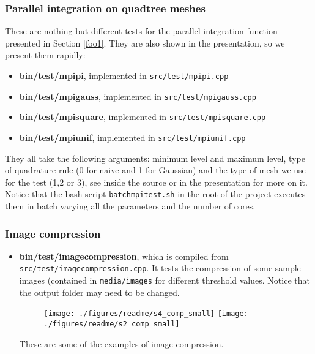 \documentclass[a4paper,10pt]{article}
\begin{document}
\subsubsection{Parallel integration on quadtree meshes}
These are nothing but different tests for the parallel integration function presented in Section \ref{foo1}. They are also shown in the presentation, so we present them rapidly:
\begin{itemize}
 \item \textbf{bin/test/mpi\textunderscore pi}, implemented in \texttt{src/test/mpi\textunderscore pi.cpp}
  \item \textbf{bin/test/mpi\textunderscore gauss}, implemented in \texttt{src/test/mpi\textunderscore gauss.cpp}
   \item \textbf{bin/test/mpi\textunderscore square}, implemented in \texttt{src/test/mpi\textunderscore square.cpp}
    \item \textbf{bin/test/mpi\textunderscore unif}, implemented in \texttt{src/test/mpi\textunderscore unif.cpp}
\end{itemize}
They all take the following arguments: minimum level and maximum level, type of quadrature rule (0 for naive and 1 for Gaussian) and the type of mesh we use for the test (1,2 or 3), see inside the source or in the presentation for more on it.
Notice that the bash script \texttt{batch\textunderscore mpi\textunderscore test.sh} in the root of the project executes them in batch varying all the parameters and the number of cores.
\subsubsection{Image compression}
\begin{itemize}
 \item \textbf{bin/test/image\textunderscore compression}, which is compiled from \texttt{src/test/image\textunderscore compression.cpp}.
 It tests the compression of some sample images (contained in \texttt{media/images} for different threshold values. Notice that the output folder may need to be changed.
  \begin{figure}[H]
\begin{center}
\texttt{[image: ./figures/readme/s4\_comp\_small]}
\texttt{[image: ./figures/readme/s2\_comp\_small]}
\end{center}
\end{figure}
These are some of the examples of image compression.
\end{itemize}
\end{document}
